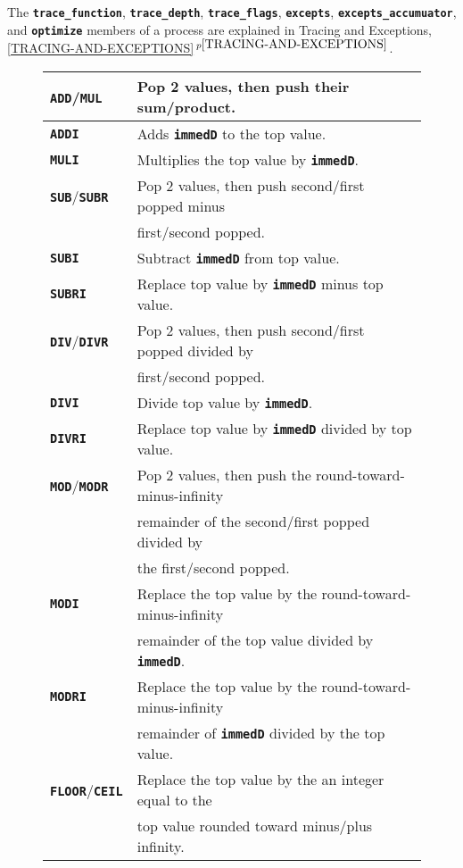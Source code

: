 \documentclass[12pt]{article}
\newcommand{\TT}[1]{{\tt \bfseries #1}}
\newcommand{\itemref}[1]{\ref{#1}$\,^{p\pageref{#1}}$}
\newlength{\figurewidth}
\newenvironment{boxedfigure}[1][!btp]%
	{\begin{figure*}[#1]
	 \begin{lrbox}{\figurebox}
	 \begin{minipage}{\figurewidth}

	 \vspace*{1ex}}%
	{
	 \vspace*{1ex}

	 \end{minipage}
	 \end{lrbox}

	 \centering
	 \fbox{\hspace*{0.1in}\usebox{\figurebox}\hspace*{0.1in}}
	 \end{figure*}}
\begin{document}
The \TT{trace\_function}, \TT{trace\_depth}, \TT{trace\_flags}, \TT{excepts},
\TT{excepts\_accumuator}, and \TT{optimize}
members of a process
are explained in Tracing and Exceptions, \itemref{TRACING-AND-EXCEPTIONS}.


\begin{boxedfigure}

\begin{center}
\begin{tabular}{|l|l|}
\hline
\TT{ADD}/\TT{MUL}
    & Pop 2 values, then push their sum/product.
\\\hline
\TT{ADDI}
    & Adds \TT{immedD} to the top value.
\\\hline
\TT{MULI}
    & Multiplies the top value by \TT{immedD}.
\\\hline
\TT{SUB}/\TT{SUBR}
    & Pop 2 values, then push second/first popped minus \\
    & first/second popped.
\\\hline
\TT{SUBI}
    & Subtract \TT{immedD} from top value.
\\\hline
\TT{SUBRI}
    & Replace top value by \TT{immedD} minus top value.
\\\hline
\TT{DIV}/\TT{DIVR}
    & Pop 2 values, then push second/first popped divided by\\
    & first/second popped.
\\\hline
\TT{DIVI}
    & Divide top value by \TT{immedD}.
\\\hline
\TT{DIVRI}
    & Replace top value by \TT{immedD} divided by top value.
\\\hline
\TT{MOD}/\TT{MODR}
    & Pop 2 values, then push the round-toward-minus-infinity \\
    & remainder of the second/first popped divided by \\
    & the first/second popped.
\\\hline
\TT{MODI}
    & Replace the top value by the round-toward-minus-infinity \\
    & remainder of the top value divided by \TT{immedD}.
\\\hline
\TT{MODRI}
    & Replace the top value by the round-toward-minus-infinity \\
    & remainder of \TT{immedD} divided by the top value.
\\\hline
\TT{FLOOR}/\TT{CEIL}
    & Replace the top value by the an integer equal to the \\
    & top value rounded toward minus/plus infinity.
\\\hline

\end{tabular}
\end{center}
\end{boxedfigure}
\end{document}
